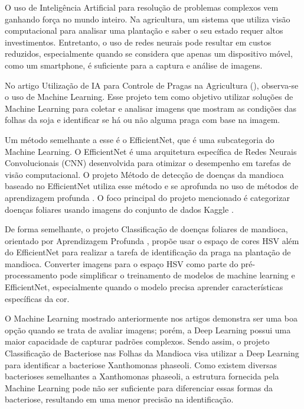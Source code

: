 O uso de Inteligência Artificial para resolução de problemas complexos vem ganhando força no mundo inteiro. Na agricultura, um sistema que utiliza visão computacional para analisar uma plantação e saber o seu estado requer altos investimentos. Entretanto, o uso de redes neurais pode resultar em custos reduzidos, especialmente quando se considera que apenas um dispositivo móvel, como um smartphone, é suficiente para a captura e análise de imagens.

No artigo Utilização de IA para Controle de Pragas na Agricultura (\textcite{CPA2022}), observa-se o uso de Machine Learning. Esse projeto tem como objetivo utilizar soluções de Machine Learning para coletar e analisar imagens que mostram as condições das folhas da soja e identificar se há ou não alguma praga com base na imagem.

Um método semelhante a esse é o EfficientNet, que é uma subcategoria do Machine Learning. O EfficientNet é uma arquitetura específica de Redes Neurais Convolucionais (CNN) desenvolvida para otimizar o desempenho em tarefas de visão computacional. O projeto Método de detecção de doenças da mandioca baseado no EfficientNet utiliza esse método e se aprofunda no uso de métodos de aprendizagem profunda . O foco principal do projeto mencionado é categorizar doenças foliares usando imagens do conjunto de dados Kaggle \cite{Leaf}.

De forma semelhante, o projeto Classificação de doenças foliares de mandioca, orientado por Aprendizagem Profunda \textcite{EfficientNet}, propõe usar o espaço de cores HSV além do EfficientNet para realizar a tarefa de identificação da praga na plantação de mandioca. Converter imagens para o espaço HSV como parte do pré-processamento pode simplificar o treinamento de modelos de machine learning e EfficientNet, especialmente quando o modelo precisa aprender características específicas da cor.

O Machine Learning mostrado anteriormente nos artigos demonstra ser uma boa opção quando se trata de avaliar imagens; porém, a Deep Learning possui uma maior capacidade de capturar padrões complexos. Sendo assim, o projeto Classificação de Bacteriose nas Folhas da Mandioca visa utilizar a Deep Learning para identificar a bacteriose Xanthomonas phaseoli. Como existem diversas bacterioses semelhantes a Xanthomonas phaseoli, a estrutura fornecida pela Machine Learning pode não ser suficiente para diferenciar essas formas da bacteriose, resultando em uma menor precisão na identificação.